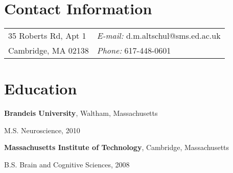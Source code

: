 \documentclass[margin,line]{res}
\newenvironment{list1}{
  \begin{list}{\ding{113}}{%
      \setlength{\itemsep}{0in}
      \setlength{\parsep}{0in} \setlength{\parskip}{0in}
      \setlength{\topsep}{0in} \setlength{\partopsep}{0in} 
      \setlength{\leftmargin}{0.17in}}}{\end{list}}
\begin{document}

\begin{resume}
\section{\sc Contact Information}
\vspace{.05in}
\begin{tabular}{@{}p{3in}p{4in}}
35 Roberts Rd, Apt 1   & {\it E-mail:}  d.m.altschul@sms.ed.ac.uk\\            
Cambridge, MA  02138 & {\it Phone:} 617-448-0601 \\    
\end{tabular}



\section{\sc Education}

{\bf Brandeis University}, Waltham, Massachusetts\\
\vspace*{-.1in}
\begin{list1}
\item[] M.S. Neuroscience, 2010
\vspace*{.05in}
\end{list1}

{\bf Massachusetts Institute of Technology}, Cambridge, Massachusetts\\
\vspace*{-.1in}
\begin{list1}
\item[] B.S. Brain and Cognitive Sciences, 2008
\vspace*{.05in}
\end{list1}


\end{resume}
\end{document}
